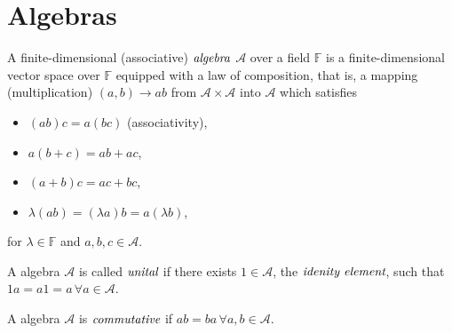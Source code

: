 
\section{Algebras} %
\label{sec:algebras}

\begin{defn}[Algebras]
	A finite-dimensional (associative) $\emph{algebra}$ $\mathcal{A}$
	over a field $\mathbb{F}$ is a finite-dimensional vector space over
	$\mathbb{F}$ equipped with a law of composition, that is, a mapping
	(multiplication) $(a,b) \to ab$ from $\mathcal{A} \times \mathcal{A}$
	into $\mathcal{A}$ which satisfies
	\begin{itemize}
		\item $(ab)c=a(bc)$ (associativity),
		\item $a(b + c) = ab + ac$,
		\item $(a + b)c = ac + bc$,
		\item $\lambda (ab) = (\lambda a)b = a(\lambda b)$,
	\end{itemize}
	for $\lambda \in \mathbb{F}$ and $a,b,c \in \mathcal{A}$.
\end{defn}

\begin{rem}
	A algebra $\mathcal{A}$ is called $\emph{unital}$ if there exists
	$1 \in \mathcal{A}$, the $\emph{idenity element}$, such that
	$1a=a1=a \, \forall a \in \mathcal{A}$.
\end{rem}

\begin{rem}
	A algebra $\mathcal{A}$ is $\emph{commutative}$ if
	$ab=ba \, \forall a,b \in \mathcal{A}$.
\end{rem}
